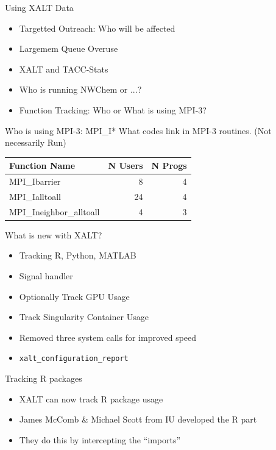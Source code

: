 \documentclass{beamer}
\begin{document}
\begin{frame}{Using XALT Data}
  \begin{itemize}
    \item Targetted Outreach: Who will be affected
    \item Largemem Queue Overuse
    \item XALT and TACC-Stats
    \item Who is running NWChem or ...?
    \item Function Tracking: Who or What is using MPI-3?      
  \end{itemize}
\end{frame}

\begin{frame}{Who is using MPI-3: MPI\_I*}
    What codes link in MPI-3 routines.  (Not necessarily Run)
    \begin{tabular}{|l|r|r|}
        \hline
        Function Name            & N Users    & N Progs \\\hline\hline
        MPI\_Ibarrier            &  8         & 4       \\\hline
        MPI\_Ialltoall           & 24         & 4       \\\hline
        MPI\_Ineighbor\_alltoall &  4         & 3       \\\hline
    \end{tabular}

\end{frame}

\begin{frame}{What is new with XALT?}
  \begin{itemize}
    \item Tracking R, Python, MATLAB
    \item Signal handler
    \item Optionally Track GPU Usage
    \item Track Singularity Container Usage
    \item Removed three system calls for improved speed
    \item \texttt{xalt\_configuration\_report}
  \end{itemize}
\end{frame}

\begin{frame}{Tracking R packages}
  \begin{itemize}
    \item XALT can now track R package usage
    \item James McComb \& Michael Scott from IU developed the R part
    \item They do this by intercepting the ``imports''
  \end{itemize}
\end{frame}
\end{document}
